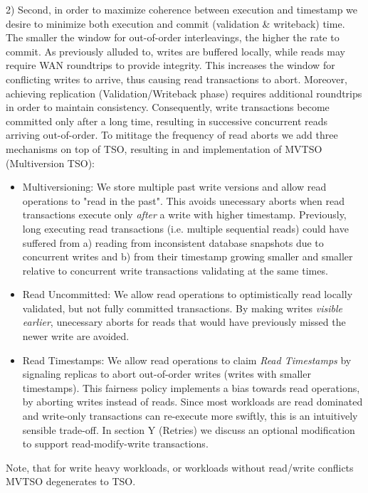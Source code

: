 2) Second, in order to maximize coherence between execution and timestamp we desire to minimize both execution and commit (validation \& writeback) time. The smaller the window for out-of-order interleavings, the higher the rate to commit. As previously alluded to, writes are buffered locally, while reads may require WAN roundtrips to provide integrity. This increases the window for conflicting writes to arrive, thus causing read transactions to abort.
Moreover, achieving replication (Validation/Writeback phase) requires additional roundtrips in order to maintain consistency. Consequently, write transactions become committed only after a long time, resulting in successive concurrent reads arriving out-of-order.
To mititage the frequency of read aborts we add three mechanisms on top of TSO, resulting in and implementation of MVTSO (Multiversion TSO):
\begin{itemize}
\item Multiversioning: We store multiple past write versions and allow read operations to "read in the past". This avoids unecessary aborts when read transactions execute only \textit{after} a write with higher timestamp. Previously, long executing read transactions (i.e. multiple sequential reads) could have suffered from a) reading from inconsistent database snapshots due to concurrent writes and b) from their timestamp growing smaller and smaller relative to concurrent write transactions validating at the same times. 
\item Read Uncommitted: We allow read operations to optimistically read locally validated, but not fully committed transactions. By making writes \textit{visible earlier}, unecessary aborts for reads that would have previously missed the newer write are avoided.
\item Read Timestamps: We allow read operations to claim \textit{Read Timestamps} by signaling replicas to abort out-of-order writes (writes with smaller timestamps). This fairness policy implements a bias towards read operations, by aborting writes instead of reads. Since most workloads are read dominated and write-only transactions can re-execute more swiftly, this is an intuitively sensible trade-off. In section Y (Retries) 	we discuss an optional modification to support read-modify-write transactions. 
\end{itemize}


Note, that for write heavy workloads, or workloads without read/write conflicts MVTSO degenerates to TSO.

